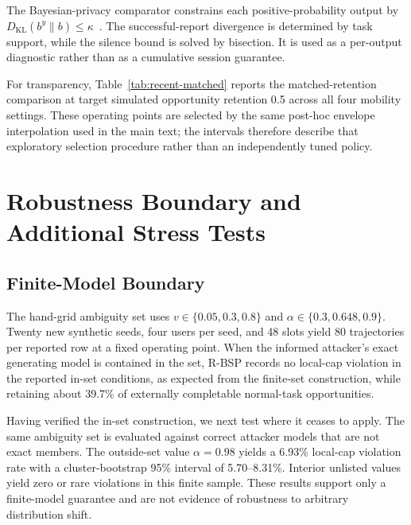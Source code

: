 \documentclass[10pt,journal,compsoc]{IEEEtran}
\begin{document}
The Bayesian-privacy comparator constrains each positive-probability output by \(D_{\mathrm{KL}}(b^y\|b)\le\kappa\)~\cite{bayesian}. The successful-report divergence is determined by task support, while the silence bound is solved by bisection. It is used as a per-output diagnostic rather than as a cumulative session guarantee.

For transparency, Table~\ref{tab:recent-matched} reports the matched-retention comparison at target simulated opportunity retention 0.5 across all four mobility settings. These operating points are selected by the same post-hoc envelope interpolation used in the main text; the intervals therefore describe that exploratory selection procedure rather than an independently tuned policy.

\begin{table}[t]
\centering\small
\caption{Exploratory matched-retention comparison at target simulated opportunity retention 0.5. \emph{Difference} is BSP MAP hit rate minus comparator MAP hit rate; negative values favor BSP for this metric.}
\label{tab:recent-matched}

\end{table}

\section{Robustness Boundary and Additional Stress Tests}
\subsection{Finite-Model Boundary}
The hand-grid ambiguity set uses \(v\in\{0.05,0.3,0.8\}\) and \(\alpha\in\{0.3,0.648,0.9\}\). Twenty new synthetic seeds, four users per seed, and 48 slots yield 80 trajectories per reported row at a fixed operating point. When the informed attacker's exact generating model is contained in the set, R-BSP records no local-cap violation in the reported in-set conditions, as expected from the finite-set construction, while retaining about 39.7\% of externally completable normal-task opportunities.
\begin{table}[t]
\centering\small
\caption{Finite-model R-BSP stress at \(\rho=0.1\).}

\end{table}

Having verified the in-set construction, we next test where it ceases to apply. The same ambiguity set is evaluated against correct attacker models that are not exact members. The outside-set value \(\alpha=0.98\) yields a 6.93\% local-cap violation rate with a cluster-bootstrap 95\% interval of 5.70--8.31\%. Interior unlisted values yield zero or rare violations in this finite sample. These results support only a finite-model guarantee and are not evidence of robustness to arbitrary distribution shift.
\begin{table}[t]
\centering\small
\caption{Boundary characterization for attacker models not explicitly enumerated in the hand-grid ambiguity set.}

\end{table}
\end{document}
